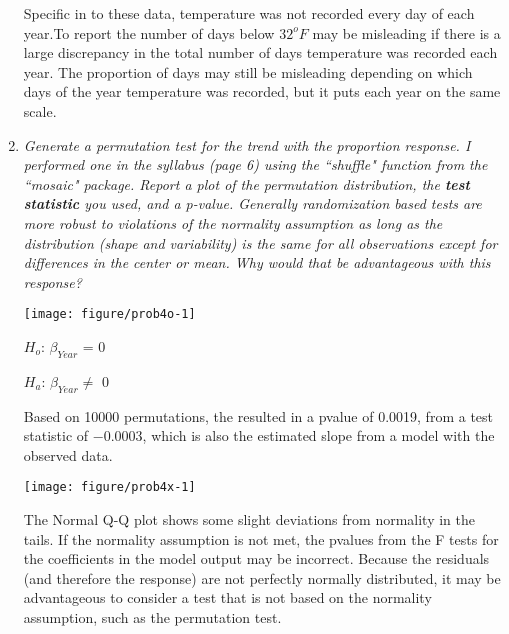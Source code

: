 \documentclass[11pt]{article}\usepackage[]{graphicx}\usepackage[]{color}
\makeatletter
\def\maxwidth{ %
  \ifdim\Gin@nat@width>\linewidth
    \linewidth
  \else
    \Gin@nat@width
  \fi
}
\newenvironment{knitrout}{}{} %
\makeatother
\begin{document}
\begin{enumerate}
Specific in to these data, temperature was not recorded every day of each year.To report the number of days below $32^{o}F$ may be misleading if there is a large discrepancy in the total number of days temperature was recorded each year. The proportion of days may still be misleading depending on which days of the year temperature was recorded, but it puts each year on the same scale.

\item%
{\it Generate a permutation test for the trend with the proportion response. I performed one in the syllabus (page 6) using the ``shuffle" function from the ``mosaic" package. Report a plot of the permutation distribution, the {\bf test statistic} you used, and a p-value. Generally randomization based tests are more robust to violations of the normality assumption as long as the distribution (shape and variability) is the same for all observations except for differences in the {\it center} or mean. Why would that be advantageous with this response?}



\begin{knitrout}\footnotesize
{}\color{fgcolor}

{\centering \texttt{[image: figure/prob4o-1]} 

}



\end{knitrout}

$H_{o}$: $\beta_{Year}$ = 0

$H_{a}$: $\beta_{Year} \neq$ 0

Based on 10000 permutations, the resulted in a pvalue of 0.0019, from a test statistic of \ensuremath{-0.0003}, which is also the estimated slope from a model with the observed data.

\begin{knitrout}\footnotesize
{}\color{fgcolor}

{\centering \texttt{[image: figure/prob4x-1]} 

}



\end{knitrout}
The Normal Q-Q plot shows some slight deviations from normality in the tails. If the normality assumption is not met, the pvalues from the F tests for the coefficients in the model output may be incorrect. Because the residuals (and therefore the response) are not perfectly normally distributed, it may be advantageous to consider a test that is not based on the normality assumption, such as the permutation test.


\end{enumerate}
\end{document}
